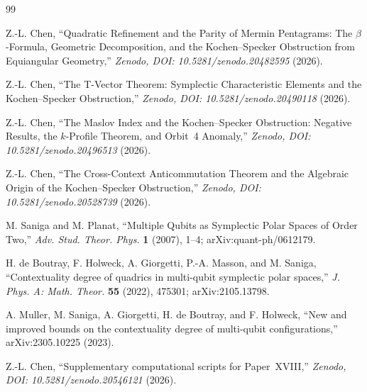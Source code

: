 \documentclass[11pt,a4paper]{article}
\theoremstyle{remark}
\begin{document}
\begin{thebibliography}{99}

Z.-L. Chen,
``Quadratic Refinement and the Parity of Mermin Pentagrams:
The $\beta$-Formula, Geometric Decomposition, and the
Kochen--Specker Obstruction from Equiangular Geometry,''
\textit{Zenodo, DOI: 10.5281/zenodo.20482595} (2026).

Z.-L. Chen,
``The T-Vector Theorem: Symplectic Characteristic Elements
and the Kochen--Specker Obstruction,''
\textit{Zenodo, DOI: 10.5281/zenodo.20490118} (2026).

Z.-L. Chen,
``The Maslov Index and the Kochen--Specker Obstruction:
Negative Results, the $k$-Profile Theorem, and Orbit~4 Anomaly,''
\textit{Zenodo, DOI: 10.5281/zenodo.20496513} (2026).

Z.-L. Chen,
``The Cross-Context Anticommutation Theorem
and the Algebraic Origin of the Kochen--Specker Obstruction,''
\textit{Zenodo, DOI: 10.5281/zenodo.20528739} (2026).

M. Saniga and M. Planat,
``Multiple Qubits as Symplectic Polar Spaces of Order Two,''
\textit{Adv. Stud. Theor. Phys.} \textbf{1} (2007), 1--4;
arXiv:quant-ph/0612179.

H. de Boutray, F. Holweck, A. Giorgetti, P.-A. Masson, and M. Saniga,
``Contextuality degree of quadrics in multi-qubit symplectic polar spaces,''
\textit{J. Phys. A: Math. Theor.} \textbf{55} (2022), 475301;
arXiv:2105.13798.

A. Muller, M. Saniga, A. Giorgetti, H. de Boutray, and F. Holweck,
``New and improved bounds on the contextuality degree of multi-qubit configurations,''
arXiv:2305.10225 (2023).

Z.-L. Chen,
``Supplementary computational scripts for Paper~XVIII,''
\textit{Zenodo, DOI: 10.5281/zenodo.20546121} (2026).

\end{thebibliography}
\end{document}
